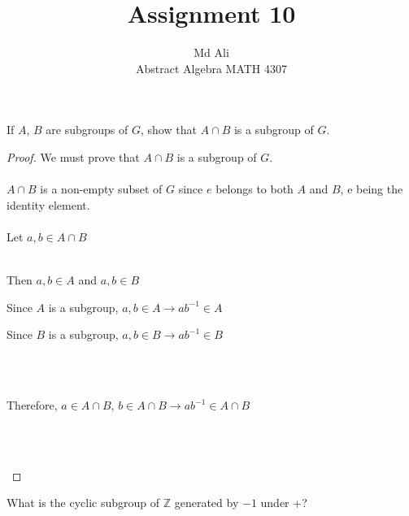 \documentclass[12pt]{article}
\newenvironment{problem}[2][Problem]{\begin{trivlist}
\item[\hskip \labelsep {\bfseries #1}\hskip \labelsep {\bfseries #2.}]}{\end{trivlist}}
\begin{document}
 
 
\title{Assignment 10}%
\author{Md Ali\\ %
Abstract Algebra MATH 4307} %
 
\maketitle
 
\begin{problem}{2.3.1} %
If $A$, $B$ are subgroups of $G$, show that $A \cap B$ is a subgroup of $G$.
\end{problem}
 
\begin{proof}
We must prove that $A \cap B$ is a subgroup of $G$. \\ \\
$A \cap B$ is a non-empty subset of $G$ since $e$ belongs to both $A$ and $B$, e being the identity element.\\ \\
Let $a,b \in A \cap B$ \\ \\
\centerline{Then $a,b \in A$ and $a,b \in B$}
\centerline{Since $A$ is a subgroup, $a,b \in A \rightarrow ab^{-1} \in A$}
\centerline{Since $B$ is a subgroup, $a,b \in B \rightarrow ab^{-1} \in B$} \\ \\
\centerline{Therefore, $a \in A \cap B$, $b \in A \cap B \rightarrow ab^{-1} \in A \cap B$} \\ \\
\centerline{}
\end{proof}

\begin{problem}{2.3.2}
What is the cyclic subgroup of $\mathbb{Z}$ generated by $-1$ under $+$?
\end{problem}
\end{document}

